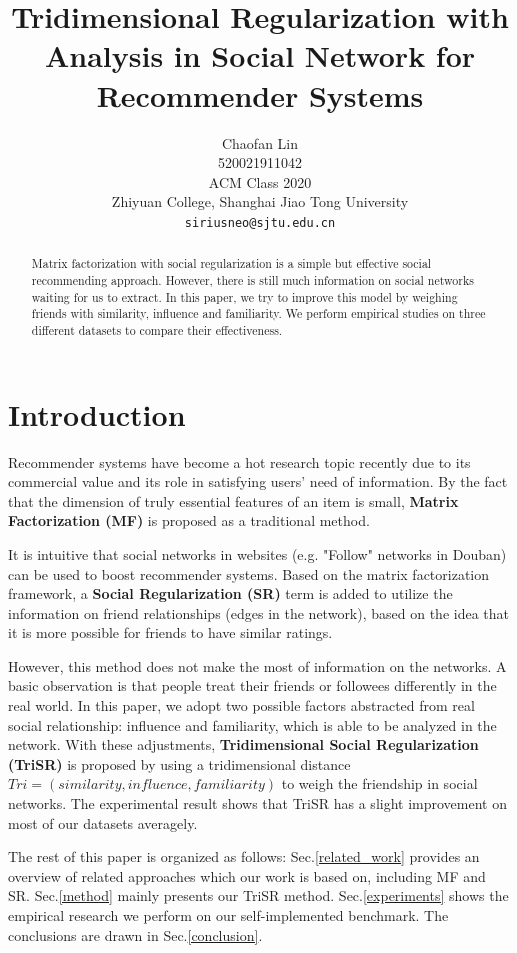 \documentclass{article}
\title{Tridimensional Regularization with Analysis in Social Network for Recommender Systems}
\author{
  Chaofan Lin \\
    520021911042\\
    ACM Class 2020\\
    Zhiyuan College, Shanghai Jiao Tong University \\
  \texttt{siriusneo@sjtu.edu.cn} \\
}
\begin{document}
\maketitle

\begin{abstract}
  Matrix factorization with social regularization is a simple but effective social 
  recommending approach. However, there is still 
  much information on social networks
  waiting for us to extract.
  In this paper, we try to improve this model 
  by weighing friends with similarity, influence and familiarity.
  We perform empirical studies 
  on three different datasets to compare their effectiveness.
\end{abstract}


\section{Introduction}

Recommender systems have become a hot research topic recently
due to its commercial value and its role in satisfying users'
need of information. By the fact that the dimension of truly essential features of an item is small, 
\textbf{Matrix Factorization (MF)} \cite{ko2009mf} is proposed as a traditional method.

It is intuitive that 
social networks in websites (e.g. "Follow" networks in Douban) 
can be used to boost recommender systems. Based on the matrix factorization framework, 
a \textbf{Social Regularization (SR)} \cite{ma2011rsr} term is added to utilize the information on friend relationships 
(edges in the network), based on the idea that it is more possible for friends to 
have similar ratings.

However, this method does not make 
the most of information on the networks. A basic observation is that people treat 
their friends or followees differently in the real world.
In this paper, we adopt two possible factors abstracted from real social relationship:
influence and familiarity, which is able to be analyzed in the network. 
With these adjustments, \textbf{Tridimensional Social Regularization (TriSR)} 
is proposed by using a tridimensional distance 
$Tri = (similarity, influence, familiarity)$ 
to weigh the friendship in social networks. The experimental result shows
that TriSR has a slight improvement on most of our datasets averagely.

The rest of this paper is organized as follows: 
Sec.\ref{related_work} 
provides an overview of related approaches which our work is based on, including MF and SR.
Sec.\ref{method} mainly presents our TriSR method. 
Sec.\ref{experiments} shows the empirical research we perform on our 
self-implemented benchmark. The conclusions are drawn in Sec.\ref{conclusion}. 
\end{document}
